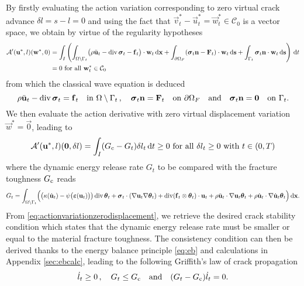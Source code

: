 By firstly evaluating the action variation corresponding to zero virtual crack advance $\delta l=s-l=0$ and using the fact that $\vec{v}_t^*-\vec{u}_t^*=\vec{w}_t^*\in\mathcal{C}_0$ is a vector space, we obtain by virtue of the regularity hypotheses
\begin{equation} \label{eq:actionvariationzerocrackadvance}
\begin{aligned}
\mathcal{A}'(\vec{u}^*,l)(\vec{w}^*,0) &= \int_I\left(\int_\domaint\bigl(\rho\ddot{\vec{u}}_t-\div\sig_t-\vec{f}_t\bigr)\cdot\vec{w}_t\dx+\int_{\partial\Omega_F}(\sig_t\vec{n}-\vec{F}_t)\cdot\vec{w}_t\D{\vec{s}}+\int_{\Gamma_t}\sig_t\vec{n}\cdot\vec{w}_t\D{\vec{s}}\right)\D{t} \\
&= 0\text{ for all $\vec{w}_t^*\in\mathcal{C}_0$}
\end{aligned}
\end{equation}
from which the classical wave equation is deduced
\begin{equation} \label{eq:classicalwave}
\rho\ddot{\vec{u}}_t-\div\sig_t=\vec{f}_t\quad\text{in }\domaint\,,\quad\sig_t\vec{n}=\vec{F}_t\quad\text{on }\partial\Omega_F\quad\text{and}\quad\sig_t\vec{n}=\vec{0}\quad\text{on }\Gamma_t.
\end{equation}
We then evaluate the action derivative with zero virtual displacement variation $\vec{w}^*=\vec{0}$, leading to
\begin{equation} \label{eq:actionvariationzerodisplacement}
\mathcal{A}'(\vec{u}^*,l)(\vec{0},\delta l)=\int_I(\gc-G_t)\delta l_t\D{t}\geq 0\text{ for all $\delta l_t\geq 0$ with $t\in(0,T)$}
\end{equation}
where the dynamic energy release rate $G_t$ to be compared with the fracture toughness $G_\mathrm{c}$ reads 
\begin{equation} \label{eq:Gt}
G_t=\int_\domaint\Bigl(\bigl(\kappa(\dot{\vec{u}}_t)-\psi\bigl(\eps(\vec{u}_t)\bigr)\bigr)\div\vtheta_t+\sig_t\cdot(\nabla\vec{u}_t\nabla\vtheta_t)+\div(\vec{f}_t\otimes\vtheta_t)\cdot\vec{u}_t+\rho\ddot{\vec{u}}_t\cdot\nabla\vec{u}_t\vtheta_t+\rho\dot{\vec{u}}_t\cdot\nabla\dot{\vec{u}}_t\vtheta_t\Bigr)\dx.
\end{equation}
From \eqref{eq:actionvariationzerodisplacement}, we retrieve the desired crack stability condition which states that the dynamic energy release rate must be smaller or equal to the material fracture toughness. The consistency condition can then be derived thanks to the energy balance principle \eqref{eq:eb} and calculations in Appendix \ref{sec:ebcalc}, leading to the following Griffith's law of crack propagation
\begin{equation} \label{eq:griffithslaw}
\dot{l}_t\geq0\,,\quad G_t\leq G_\mathrm{c}\quad\text{and}\quad(G_t-G_\mathrm{c})\dot{l}_t=0.
\end{equation}

